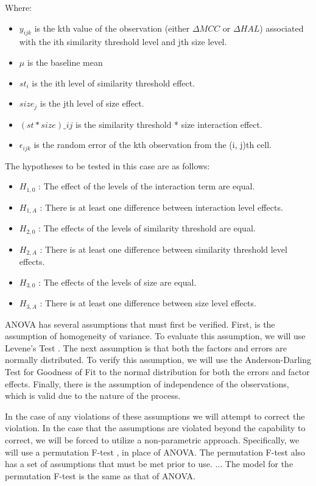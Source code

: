 \documentclass[10pt,nocc]{xrese_report}
\begin{document}
\noindent Where:
\begin{itemize}
\item $y_{ijk}$ is the kth value of the observation (either $\Delta MCC$ or $\Delta HAL$) associated with the ith similarity threshold level and jth size level.
\item $\mu$ is the baseline mean
\item $st_{i}$ is the ith level of similarity threshold effect.
\item $size_{j}$ is the jth level of size effect.
\item $(st * size)\_{ij}$ is the similarity threshold * size interaction effect.
\item $\epsilon_{ijk}$ is the random error of the kth observation from the (i, j)th cell.
\end{itemize}

\noindent The hypotheses to be tested in this case are as follows:

\begin{itemize}
\item $H_{1,0}$ : The effect of the levels of the interaction term are equal.
\item $H_{1,A}$ : There is at least one difference between interaction level effects.
\item $H_{2,0}$ : The effects of the levels of similarity threshold are equal.
\item $H_{2,A}$ : There is at least one difference between similarity threshold level effects.
\item $H_{3,0}$ : The effects of the levels of size are equal.
\item $H_{3,A}$ : There is at least one difference between size level effects.
\end{itemize}

ANOVA has several assumptions that must first be verified. First, is the assumption of homogeneity of variance. To evaluate this assumption, we will use Levene's Test \cite{levene_robust_1960}. The next assumption is that both the factors and errors are normally distributed. To verify this assumption, we will use the Anderson-Darling Test for Goodness of Fit \cite{anderson_test_1954} to the normal distribution for both the errors and factor effects. Finally, there is the assumption of independence of the observations, which is valid due to the nature of the process.

In the case of any violations of these assumptions we will attempt to correct the violation. In the case that the assumptions are violated beyond the capability to correct, we will be forced to utilize a non-parametric approach. Specifically, we will use a permutation F-test \cite{higgins_introduction_2004}, in place of ANOVA. The permutation F-test also has a set of assumptions that must be met prior to use. ... The model for the permutation F-test is the same as that of ANOVA.
\end{document}
